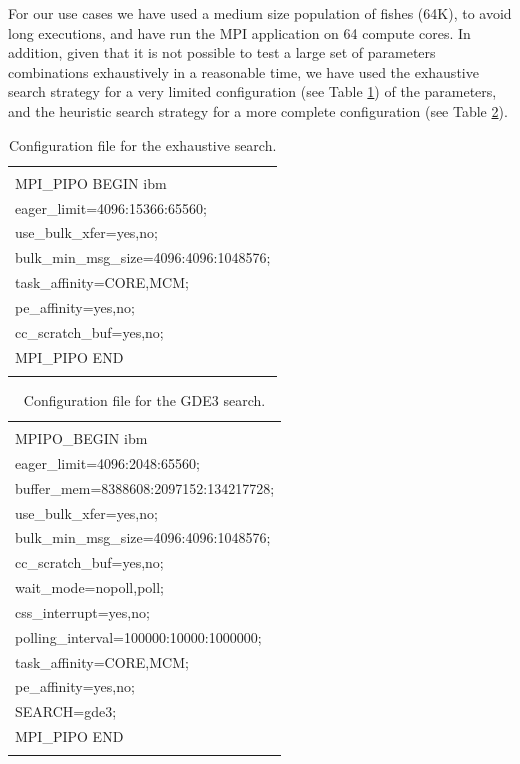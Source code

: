 For our use cases we have used a medium size population of fishes (64K), to avoid long executions, and have run the MPI application on 64 compute cores. In addition, given that it is not possible to test a large set of parameters combinations exhaustively in a reasonable time, we have used the exhaustive search strategy for a very limited configuration (see Table \ref{table:MPIConfigFileExhaustive}) of the parameters, and the heuristic search strategy for a more complete configuration (see Table \ref{table:MPIConfigFileGDE3}).

\begin{table}[tb]
	\centering
	\begin{footnotesize}
		\begin{tabular}{| l | }
		\hline
			\\
			MPI\_PIPO BEGIN ibm \\
			eager\_limit=4096:15366:65560; \\
			use\_bulk\_xfer=yes,no; \\
			bulk\_min\_msg\_size=4096:4096:1048576; \\
			task\_affinity=CORE,MCM; \\
			pe\_affinity=yes,no; \\
			cc\_scratch\_buf=yes,no; \\
			MPI\_PIPO END \\
			\\
		\hline
		\end{tabular}
	\caption{Configuration file for the exhaustive search.}
	\label{table:MPIConfigFileExhaustive}
	\end{footnotesize}
\end{table}


\begin{table}[tb]
	\centering
	\begin{footnotesize}
		\begin{tabular}{| l | }
		\hline
			\\
			MPIPO\_BEGIN ibm\\
			eager\_limit=4096:2048:65560;\\
			buffer\_mem=8388608:2097152:134217728;\\
			use\_bulk\_xfer=yes,no;\\
			bulk\_min\_msg\_size=4096:4096:1048576;\\
			cc\_scratch\_buf=yes,no;\\
			wait\_mode=nopoll,poll;\\
			css\_interrupt=yes,no;\\
			polling\_interval=100000:10000:1000000;\\
			task\_affinity=CORE,MCM; \\
			pe\_affinity=yes,no; \\
			SEARCH=gde3; \\
			MPI\_PIPO END \\
			\\
		\hline
		\end{tabular}
	\caption{Configuration file for the GDE3 search.}
	\label{table:MPIConfigFileGDE3}
	\end{footnotesize}
\end{table}


